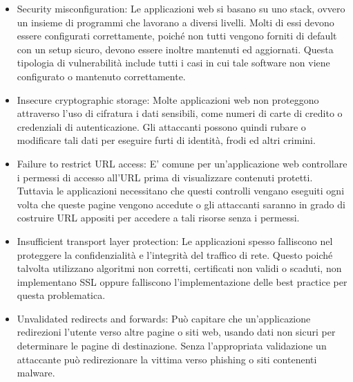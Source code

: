 \begin{itemize}
\item Security misconfiguration: Le applicazioni web si basano su uno stack, ovvero un insieme di programmi che lavorano a diversi livelli. Molti di essi devono essere configurati correttamente, poiché non tutti vengono forniti di default con un setup sicuro, devono essere inoltre mantenuti ed aggiornati. Questa tipologia di vulnerabilità include tutti i casi in cui tale software non viene configurato o mantenuto correttamente.
\item Insecure cryptographic storage: Molte applicazioni web non proteggono attraverso l'uso di cifratura i dati sensibili, come numeri di carte di credito o credenziali di autenticazione. Gli attaccanti possono quindi rubare o modificare tali dati per eseguire furti di identità, frodi ed altri crimini.
\item Failure to restrict URL access: E' comune per un'applicazione web controllare i permessi di accesso all'URL prima di visualizzare contenuti protetti. Tuttavia le applicazioni necessitano che questi controlli vengano eseguiti ogni volta che queste pagine vengono accedute o gli attaccanti saranno in grado di costruire URL appositi per accedere a tali risorse senza i permessi.
\item Insufficient transport layer protection: Le applicazioni spesso falliscono nel proteggere la confidenzialità e l'integrità del traffico di rete. Questo poiché talvolta utilizzano algoritmi non corretti, certificati non validi o scaduti, non implementano SSL oppure falliscono l'implementazione delle best practice per questa problematica.
\item Unvalidated redirects and forwards: Può capitare che un'applicazione redirezioni l'utente verso altre pagine o siti web, usando dati non sicuri per determinare le pagine di destinazione. Senza l'appropriata validazione un attaccante può redirezionare la vittima verso phishing o siti contenenti malware.
\end{itemize} 

